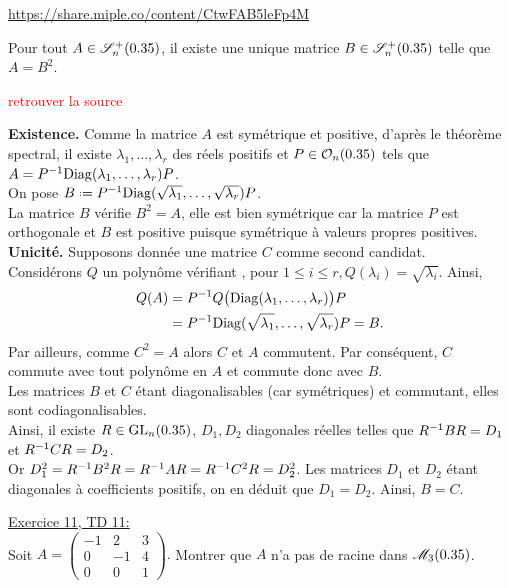 \url{https://share.miple.co/content/CtwFAB5leFp4M}
\begin{prop}{}
    Pour tout $A \in \mathscr{S}_n^+(0.35)$, il existe une unique matrice $B \in \mathscr{S}_n^+(0.35)$ telle que $A = B^2$. 
\end{prop}
\textcolor{red}{retrouver la source}
\begin{preuve}
    \textbf{Existence.} Comme la matrice $A$ est symétrique et positive, d'après le théorème spectral, il existe $\lambda_1, \dots, \lambda_r$ des réels positifs et $P \in \mathcal{O}_n(0.35)$ tels que $A = P^{-1} \mathrm{Diag}(\lambda_1, \dots, \lambda_r) P$. \\
    On pose $B \defeq \Inv{P} \Diag(\sqrt{\lambda_1}, \dots, \sqrt{\lambda_r}) P$. \\
    La matrice $B$ vérifie $B^2 = A$, elle est bien symétrique car la matrice $P$ est orthogonale et $B$ est positive puisque symétrique à valeurs propres positives. \\
    \textbf{Unicité.} Supposons donnée une matrice $C$ comme second candidat. \\
    Considérons $Q$ un polynôme vérifiant   , pour $1 \leqslant i \leqslant r, Q(\lambda_i) = \sqrt{\lambda_i}$. Ainsi, 
    \begin{align*}
        Q(A) &= P^{-1} Q\big( \mathrm{Diag}(\lambda_1, \dots, \lambda_r) \big) P \\
        &= P^{-1} \mathrm{Diag}(\sqrt{\lambda_1}, \dots, \sqrt{\lambda_r}) P = B.
    \end{align*}
    Par ailleurs, comme $C^2 = A$ alors $C$ et $A$ commutent. Par conséquent, $C$ commute avec tout polynôme en $A$ et commute donc avec $B$. \\
    Les matrices $B$ et $C$ étant diagonalisables (car symétriques) et commutant, elles sont codiagonalisables. \\
    Ainsi, il existe $R \in \mathrm{GL}_n(0.35)$, $D_1, D_2$ diagonales réelles telles que $R^{-1}BR = D_1$ et $R^{-1}CR = D_2$. \\
    Or $D_1^2 = R^{-1} B^2 R = R^{-1} A R = R^{-1} C^2 R = D_2^2$. Les matrices $D_1$ et $D_2$ étant diagonales à coefficients positifs, on en déduit que $D_1 = D_2$. Ainsi, $B = C$.
\end{preuve}

\begin{exercice}
    \underline{Exercice 11, TD 11:}\\
    Soit $A = 
    \begin{pmatrix}
        -1 & 2 & 3 \\
        0 & - 1 & 4 \\
        0 & 0 & 1
    \end{pmatrix}. 
    $ Montrer que $A$ n'a pas de racine dans $\mathscr{M}_3(0.35)$. 
\end{exercice}
